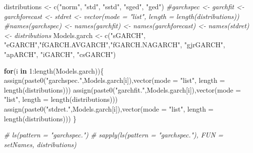 \documentclass[a4paper, twoside]{templates/ociamthesis}
\newenvironment{Shaded}{\begin{snugshade}}{\end{snugshade}}
\newcommand{\AttributeTok}[1]{\textcolor[rgb]{0.77,0.63,0.00}{#1}}
\newcommand{\CommentTok}[1]{\textcolor[rgb]{0.56,0.35,0.01}{\textit{#1}}}
\newcommand{\ControlFlowTok}[1]{\textcolor[rgb]{0.13,0.29,0.53}{\textbf{#1}}}
\newcommand{\DecValTok}[1]{\textcolor[rgb]{0.00,0.00,0.81}{#1}}
\newcommand{\FunctionTok}[1]{\textcolor[rgb]{0.00,0.00,0.00}{#1}}
\newcommand{\NormalTok}[1]{#1}
\newcommand{\OtherTok}[1]{\textcolor[rgb]{0.56,0.35,0.01}{#1}}
\newcommand{\SpecialCharTok}[1]{\textcolor[rgb]{0.00,0.00,0.00}{#1}}
\newcommand{\StringTok}[1]{\textcolor[rgb]{0.31,0.60,0.02}{#1}}
\renewenvironment{Shaded}
{
  \vspace{10pt}%
  \begin{snugshade}%
}{%
  \end{snugshade}%
  \vspace{8pt}%
}
\begin{document}
\begin{Shaded}
\begin{Highlighting}[]
\NormalTok{distributions }\OtherTok{\textless{}{-}} \FunctionTok{c}\NormalTok{(}\StringTok{"norm"}\NormalTok{, }\StringTok{"std"}\NormalTok{, }\StringTok{"sstd"}\NormalTok{, }\StringTok{"sged"}\NormalTok{, }\StringTok{"ged"}\NormalTok{)}
\CommentTok{\#garchspec \textless{}{-} garchfit \textless{}{-} garchforecast \textless{}{-} stdret \textless{}{-} vector(mode = "list", length = length(distributions))}
\CommentTok{\#names(garchspec) \textless{}{-} names(garchfit) \textless{}{-} names(garchforecast) \textless{}{-} names(stdret) \textless{}{-} distributions}
\NormalTok{Models.garch }\OtherTok{\textless{}{-}} \FunctionTok{c}\NormalTok{(}\StringTok{"sGARCH"}\NormalTok{, }\StringTok{"eGARCH"}\NormalTok{,}\StringTok{"fGARCH.AVGARCH"}\NormalTok{,}\StringTok{"fGARCH.NAGARCH"}\NormalTok{, }\StringTok{"gjrGARCH"}\NormalTok{, }\StringTok{"apARCH"}\NormalTok{, }\StringTok{"iGARCH"}\NormalTok{, }\StringTok{"csGARCH"}\NormalTok{)}

\ControlFlowTok{for}\NormalTok{(i }\ControlFlowTok{in} \DecValTok{1}\SpecialCharTok{:}\FunctionTok{length}\NormalTok{(Models.garch))\{}
\FunctionTok{assign}\NormalTok{(}\FunctionTok{paste0}\NormalTok{(}\StringTok{"garchspec."}\NormalTok{,Models.garch[i]),}\FunctionTok{vector}\NormalTok{(}\AttributeTok{mode =} \StringTok{"list"}\NormalTok{, }\AttributeTok{length =} \FunctionTok{length}\NormalTok{(distributions)))}
\FunctionTok{assign}\NormalTok{(}\FunctionTok{paste0}\NormalTok{(}\StringTok{"garchfit."}\NormalTok{,Models.garch[i]),}\FunctionTok{vector}\NormalTok{(}\AttributeTok{mode =} \StringTok{"list"}\NormalTok{, }\AttributeTok{length =} \FunctionTok{length}\NormalTok{(distributions)))}
\FunctionTok{assign}\NormalTok{(}\FunctionTok{paste0}\NormalTok{(}\StringTok{"stdret."}\NormalTok{,Models.garch[i]),}\FunctionTok{vector}\NormalTok{(}\AttributeTok{mode =} \StringTok{"list"}\NormalTok{, }\AttributeTok{length =} \FunctionTok{length}\NormalTok{(distributions)))}
\NormalTok{\} }

\CommentTok{\# ls(pattern = "garchspec.")}
\CommentTok{\# sapply(ls(pattern = "garchspec."), FUN = setNames, distributions)}


\end{Highlighting}
\end{Shaded}
\end{document}
